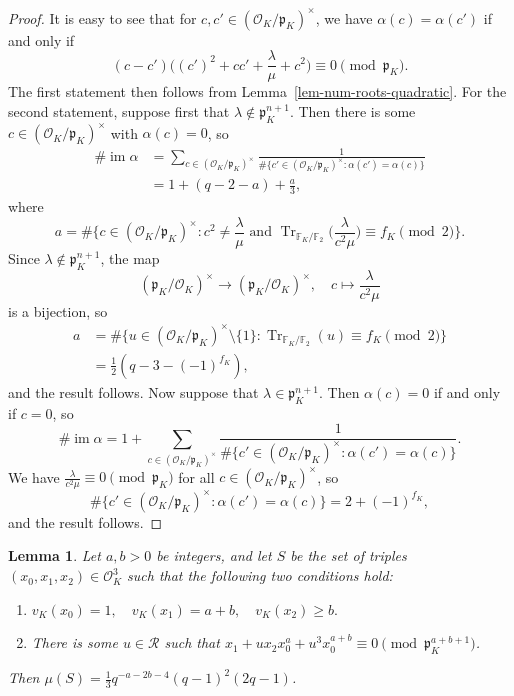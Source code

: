 \documentclass[11pt]{amsart}
\theoremstyle{theorem}
\newtheorem{lemma}[theorem]{Lemma}
\theoremstyle{example}
\theoremstyle{definition}
\numberwithin{theorem}{section}
\numberwithin{theorem}{section}
\DeclareMathOperator{\im}{im}
\DeclareMathOperator{\Tr}{Tr}
\newcommand{\co}{\mathcal{O}}
\newcommand{\F}{\mathbb{F}}
\newcommand{\p}{\mathfrak{p}}
\begin{document}
\begin{proof}
    It is easy to see that for $c,c' \in (\co_K/\p_K)^\times$, we have $\alpha(c) = \alpha(c')$ if and only if
    $$
    (c - c')\Big(
        (c')^2 + cc' + \frac{\lambda}{\mu} + c^2\Big) \equiv 0\pmod{\p_K}.
    $$
    The first statement then follows from Lemma~\ref{lem-num-roots-quadratic}. For the second statement, suppose first that $\lambda \not \in \p_K^{n+1}$. Then there is some $c \in (\co_K/\p_K)^\times$ with $\alpha(c) = 0$, so 
    \begin{align*}
    \#\im \alpha &= \sum_{c \in (\co_K/\p_K)^\times} \frac{1}{\# \{c' \in (\co_K/\p_K)^\times : \alpha(c') = \alpha(c)\}}
    \\
    &= 1 + (q-2-a) + \frac{a}{3},
    \end{align*}
    where 
    $$
    a = \#\{c \in (\co_K/\p_K)^\times : c^2 \neq \frac{\lambda}{\mu} \text{ and } \Tr_{\F_K/\F_2}\Big(\frac{\lambda}{c^2\mu}\Big) \equiv f_K\pmod{2}\}.
    $$
    Since $\lambda \not \in \p_K^{n+1}$, the map 
    $$
    (\p_K/\co_K)^\times \to (\p_K/\co_K)^\times,\quad c \mapsto \frac{\lambda}{c^2\mu}
    $$
    is a bijection, so 
    \begin{align*}
    a &= \#\{u \in (\co_K/\p_K)^\times\setminus\{1\} : \Tr_{\F_K/\F_2}(u) \equiv f_K\pmod{2}\}
    \\
    &= \frac{1}{2}(q - 3 - (-1)^{f_K}),
    \end{align*}
    and the result follows. Now suppose that $\lambda \in \p_K^{n+1}$. Then $\alpha(c) = 0$ if and only if $c = 0$, so 
    $$
        \#\im\alpha = 1 + \sum_{c \in (\co_K/\p_K)^\times} \frac{1}{\# \{c' \in (\co_K/\p_K)^\times : \alpha(c') = \alpha(c)\}}.
    $$
    We have $\frac{\lambda}{c^2\mu} \equiv 0\pmod{\p_K}$ for all $c \in (\co_K/\p_K)^\times$, so 
    $$
    \# \{c' \in (\co_K/\p_K)^\times : \alpha(c') = \alpha(c)\} = 2 + (-1)^{f_K},
    $$
    and the result follows. 
\end{proof}
\begin{lemma}
    \label{lem-density-of-cubic-cong-cond}
    Let $a, b > 0$ be integers, and let $S$ be the set of triples $(x_0,x_1,x_2) \in \co_K^3$ such that the following two conditions hold: 
    \begin{enumerate}
    \item $
    v_K(x_0) = 1, \quad v_K(x_1) = a + b, \quad v_K(x_2) \geq b.
    $
    \item There is some $u \in \mathcal{R}$ such that $x_1 + ux_2x_0^{a} + u^3x_0^{a+b} \equiv 0 \pmod{\p_K^{a + b + 1}}$. 
    \end{enumerate}
    Then $\mu(S) = \frac{1}{3}q^{-a - 2b - 4}(q-1)^2(2q-1)$.
\end{lemma}
\end{document}
